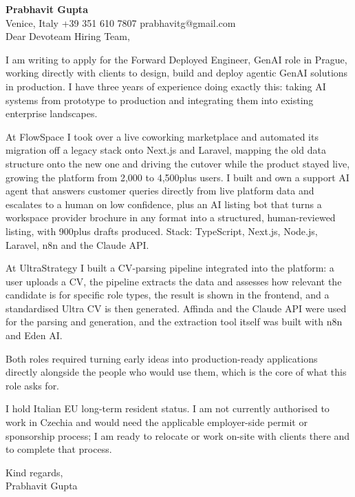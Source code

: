 \documentclass[a4paper,10.5pt]{article}
\begin{document}
\textbf{Prabhavit Gupta}\\
Venice, Italy \textbar{} +39 351 610 7807 \textbar{} prabhavitg@gmail.com\\[10pt]
Dear Devoteam Hiring Team,

I am writing to apply for the Forward Deployed Engineer, GenAI role in Prague, working directly with clients to design, build and deploy agentic GenAI solutions in production. I have three years of experience doing exactly this: taking AI systems from prototype to production and integrating them into existing enterprise landscapes.

At FlowSpace I took over a live coworking marketplace and automated its migration off a legacy stack onto Next.js and Laravel, mapping the old data structure onto the new one and driving the cutover while the product stayed live, growing the platform from 2,000 to 4,500plus users. I built and own a support AI agent that answers customer queries directly from live platform data and escalates to a human on low confidence, plus an AI listing bot that turns a workspace provider brochure in any format into a structured, human-reviewed listing, with 900plus drafts produced. Stack: TypeScript, Next.js, Node.js, Laravel, n8n and the Claude API.

At UltraStrategy I built a CV-parsing pipeline integrated into the platform: a user uploads a CV, the pipeline extracts the data and assesses how relevant the candidate is for specific role types, the result is shown in the frontend, and a standardised Ultra CV is then generated. Affinda and the Claude API were used for the parsing and generation, and the extraction tool itself was built with n8n and Eden AI.

Both roles required turning early ideas into production-ready applications directly alongside the people who would use them, which is the core of what this role asks for.

I hold Italian EU long-term resident status. I am not currently authorised to work in Czechia and would need the applicable employer-side permit or sponsorship process; I am ready to relocate or work on-site with clients there and to complete that process.

Kind regards,\\
Prabhavit Gupta
\end{document}
